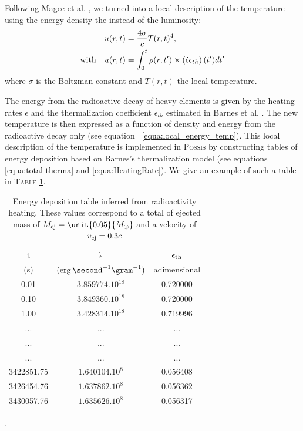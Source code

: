 \documentclass[a4paper, twoside, 11pt]{article}
\numberwithin{equation}{section}
\begin{document}
\hspace{\parindent}	  Following Magee et al. \cite{Magee}, we turned into a local description of the temperature using the energy density the instead of the luminosity:
\begin{subequations}
\label{equa:local_energy_temp}
\begin{align}
	u(r,t) & = \frac{4 \sigma}{c} T(r,t)^4, \\
{\rm{with}}\quad	u(r,t) & =\int_0^t \rho(r,t') \times \left(\dot{\epsilon}  \epsilon_{th}\right)(t') dt'
\end{align}	
\end{subequations}
\noindent where  $\sigma$ is the Boltzman constant and $T(r,t)$ the local temperature. 

\noindent The energy from the radioactive decay of heavy elements is given by the heating rates  $\dot{\epsilon}$ and  the thermalization coefficient $\epsilon_{th}$ estimated in Barnes et al. \cite{Barnes_2016}. The new temperature is then expressed as a function of density and energy from the radioactive decay only (see equation ~\eqref{equa:local_energy_temp}).  This local description of the temperature is implemented in P\textsc{ossis} by constructing tables of energy deposition based on Barnes's thermalization model  (see equations  \eqref{equa:total therma} and \eqref{equa:HeatingRate}). We give an example of such a table in T\textsc{able} \ref{table:energyDeposition}. \\

\begin{table}[!h]
\begin{center}
	\begin{tabular}{c c c}
	\hline
	\hline
	t 	&   $\dot{\epsilon}$ & $\epsilon_{\rm{th}}$  \\
	(s) &  $(\rm{erg}\, \second^{-1}\gram^{-1})$ & adimensional   \\
	\hline
	 0.01  & $3.859774.10^{18} $ & 0.720000 \\
	  0.10 & $3.849360.10^{18}  $ & 0.720000 \\
	   1.00 &	 $3.428314.10^{18} $ & 	 0.719996 \\
	             ...     &  ...      &  ...     \\
          ...     &  ...      &  ...     \\
          ...     &  ...      &  ...     \\
   3422851.75 &	 $1.640104.10^{8} $ & 	 0.056408 \\
 3426454.76 &	 $1.637862.10^{8} $ &	 0.056362 \\
3430057.76 &	 $1.635626.10^{8} $	& 0.056317 \\
\hline
\end{tabular}
\end{center}
\caption[Table of energy deposition]{Energy deposition table inferred from radioactivity heating. These values correspond to a total of ejected mass of $M_{\rm{ej}} =\unit{0.05}{M_{\rm{\odot}}}$ and a velocity of $v_{\rm{ej}}=0.3c$}.
\label{table:energyDeposition}
\end{table}
\end{document}
